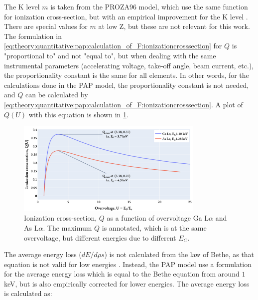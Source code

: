 The K level $m$ is taken from the PROZA96 model, which use the same function for ionization cross-section, but with an empirical improvement for the K level \cite{bastin_proza96_1998}.
There are special values for $m$ at low Z, but these are not relevant for this work.
The formulation in \cref{eq:theory:quantitative:pap:calculation_of_F:ionizationcrosssection} for $Q$ is "proportional to" and not "equal to", but when dealing with the same instrumental parameters (accelerating voltage, take-off angle, beam current, etc.), the proportionality constant is the same for all elements.
In other words, for the calculations done in the PAP model, the proportionality constant is not needed, and $Q$ can be calculated by \cref{eq:theory:quantitative:pap:calculation_of_F:ionizationcrosssection}.
A plot of $Q(U)$ with this equation is shown in \cref{fig:PAP:ionization_cross_section}.



\begin{figure}[htbp]
    \centering
    \includegraphics[width=0.8\textwidth]{figures/PAP_ionization_cross_section.pdf}
    \caption{
        Ionization cross-section, $Q$ as a function of overvoltage Ga L$\alpha$ and As L$\alpha$.
        The maximum $Q$ is annotated, which is at the same overvoltage, but different energies due to different $E_C$.
    }
    \label{fig:PAP:ionization_cross_section}
\end{figure}



The average energy loss ($dE/d\rho s$) is not calculated from the law of Bethe, as that equation is not valid for low energies \cite{inokuti_on_bethe_1971,pap_1991}.
Instead, the PAP model use a formulation for the average energy loss which is equal to the Bethe equation from around $1$ keV, but is also empirically corrected for lower energies.
The average energy loss is calculated as:


